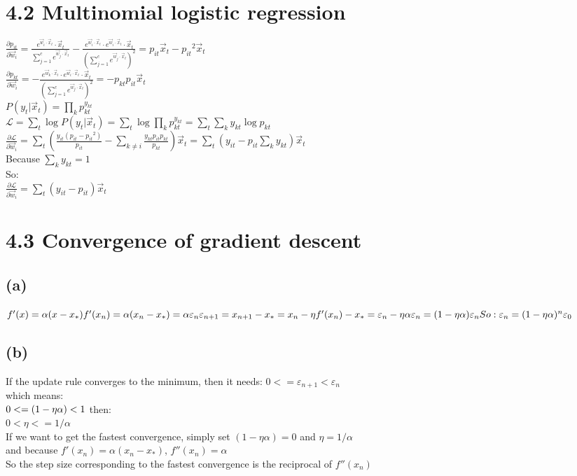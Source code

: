 \documentclass [11pt, a4paper, oneside] {article}
\begin{document}
\section *{4.2 Multinomial logistic regression}
$\frac{\partial{p_{it}}}{\partial{\vec{w}_i}} = \frac{e^{\vec{w}_i\cdot\vec{x}_t}\cdot \vec{x}_t}{\sum_{j=1}^{c}e^{\vec{w}_j\cdot\vec{x}_t}} -
\frac{e^{\vec{w}_i\cdot\vec{x}_t}\cdot e^{\vec{w}_i\cdot\vec{x}_t}\cdot \vec{x}_t}{(\sum_{j=1}^{c}e^{\vec{w}_j\cdot\vec{x}_t})^2} = 
p_{it}\vec{x}_t-{p_{it}}^2\vec{x}_t$\\
$\frac{\partial{p_{kt}}}{\partial{\vec{w}_i}} =  
-\frac{e^{\vec{w}_k\cdot\vec{x}_t}\cdot e^{\vec{w}_i\cdot\vec{x}_t}\cdot \vec{x}_t}{(\sum_{j=1}^{c}e^{\vec{w}_j\cdot\vec{x}_t})^2} = 
-p_{kt}{p_{it}}\vec{x}_t$\\
$P(y_t|\vec{x}_t) = \prod_k p_{kt}^{y_{kt}}$\\
$\mathcal{L} = \sum_t\log P(y_t|\vec{x}_t) = \sum_t\log\prod_k p_{kt}^{y_{kt}} = \sum_t\sum_k y_{kt}\log p_{kt}$\\
$\frac{\partial{\mathcal{L}}}{\partial{\vec{w}_i}} = \sum_t (\frac{y_{it}(p_{it}-{p_{it}}^2)}{p_{it}} - \sum_{k\neq i}\frac{y_{kt}p_{it}p_{kt}}{p_{kt}})\vec{x}_t 
= \sum_t (y_{it} - p_{it}\sum_k y_{kt})\vec{x}_t$\\
Because $\sum_k y_{kt} = 1$ \\
So:\\
$\frac{\partial{\mathcal{L}}}{\partial{\vec{w}_i}} = \sum_t (y_{it} - p_{it})\vec{x}_t$
\section *{4.3 Convergence of gradient descent}
\subsection *{(a)}
$f'(x) = \alpha(x-x_{*})\\
f'(x_n) = \alpha(x_n-x_{*}) = \alpha\varepsilon_n\\
\varepsilon_{n+1} = x_{n+1} - x_* = x_n - \eta f'(x_n) - x_* = \varepsilon_n - \eta\alpha\varepsilon_n = (1-\eta\alpha)\varepsilon_n\\
So:\\
\varepsilon_{n} = (1-\eta\alpha)^n\varepsilon_0$\\
\subsection *{(b)}
If the update rule converges to the minimum, then it needs:
$ 0 <= \varepsilon_{n+1} < \varepsilon_{n}$\\
which means:\\
$0<= (1-\eta\alpha) < 1 \\$
then:\\
$0	< \eta <= 1/\alpha$\\
If we want to get the fastest convergence, simply set $(1-\eta\alpha) = 0$ and $\eta = 1/\alpha$\\
and because $f'(x_n) = \alpha(x_n-x_{*})$, $f''(x_n) = \alpha$\\
So the step size corresponding to the fastest convergence is the reciprocal of $f''(x_n)$\\
\end{document}
